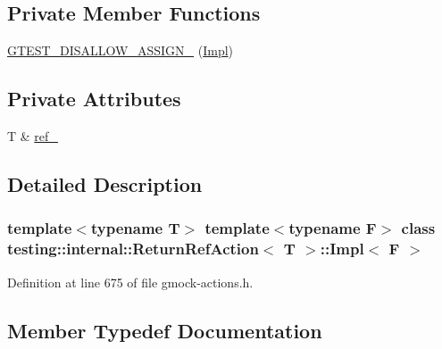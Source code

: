 \subsection*{Private Member Functions}
\begin{DoxyCompactItemize}
\item 
\hyperlink{classtesting_1_1internal_1_1ReturnRefAction_1_1Impl_ad2899b6718fb8b8aaca38419c27c2765}{G\+T\+E\+S\+T\+\_\+\+D\+I\+S\+A\+L\+L\+O\+W\+\_\+\+A\+S\+S\+I\+G\+N\+\_\+} (\hyperlink{classtesting_1_1internal_1_1ReturnRefAction_1_1Impl}{Impl})
\end{DoxyCompactItemize}
\subsection*{Private Attributes}
\begin{DoxyCompactItemize}
\item 
T \& \hyperlink{classtesting_1_1internal_1_1ReturnRefAction_1_1Impl_a647d8e360f3e2d2f4da89f7f348b40dd}{ref\+\_\+}
\end{DoxyCompactItemize}


\subsection{Detailed Description}
\subsubsection*{template$<$typename T$>$\newline
template$<$typename F$>$\newline
class testing\+::internal\+::\+Return\+Ref\+Action$<$ T $>$\+::\+Impl$<$ F $>$}



Definition at line 675 of file gmock-\/actions.\+h.



\subsection{Member Typedef Documentation}
\mbox{\label{classtesting_1_1internal_1_1ReturnRefAction_1_1Impl_a69311fc7b75aba0f2c444d6766c82a4a}} 
